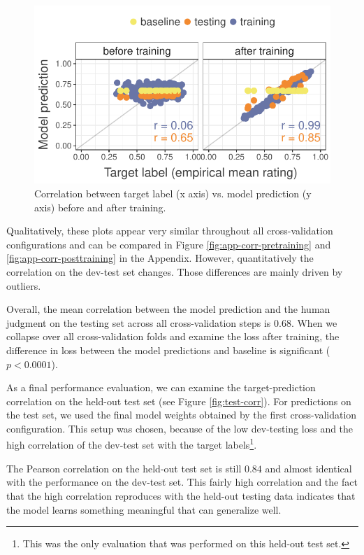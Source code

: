\documentclass[11pt,a4paper]{article}
\begin{document}
\begin{figure}
	\includegraphics[width=\linewidth]{graphs/cv0-pred-target-epoch0-29.pdf}
	\caption{Correlation between target label (x axis) vs. model prediction (y axis) before and after training.}
	\label{fig:corr-cv0}
\end{figure}

Qualitatively, these plots appear very similar throughout all cross-validation configurations and can be compared in Figure \ref{fig:app-corr-pretraining} and \ref{fig:app-corr-posttraining} in the Appendix. However, quantitatively the correlation on the dev-test set changes. Those differences are mainly driven by outliers.

Overall, the mean correlation between the model prediction and the human judgment on the testing set across all cross-validation steps is $0.68$. When we collapse over all cross-validation folds and examine the loss after training, the difference in loss between the model predictions and baseline is significant ($p<0.0001$).

\label{model-results}

As a final performance evaluation, we can examine the target-prediction correlation on the held-out test set (see Figure \ref{fig:test-corr}). For predictions on the test set, we used the final model weights obtained by the first cross-validation configuration. This setup was chosen, because of the low dev-testing loss and the high correlation of the dev-test set with the target labels\footnote{This was the only evaluation that was performed on this held-out test set.}. 

The Pearson correlation on the held-out test set is still $0.84$ and almost identical with the performance on the dev-test set. This fairly high correlation and the fact that the high correlation reproduces with the held-out testing data indicates that the model learns something meaningful that can generalize well.
\end{document}
